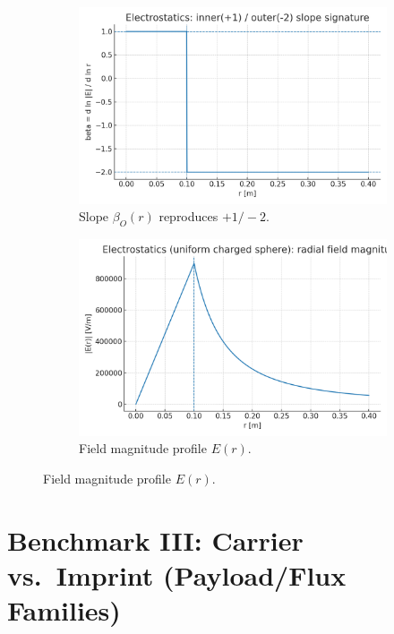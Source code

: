 \documentclass[12pt,a4paper,oneside]{scrreprt}
\begin{document}
\begin{figure}[htbp]
  \vspace{0.6em}
  \begin{subfigure}[t]{0.49\linewidth}
    \includegraphics[width=\linewidth]{electrostatics_beta_signature.png}
    \caption{Slope $\beta_O(r)$ reproduces $+1/-2$.}
    \label{fig:em:beta}
  \end{subfigure}\hfill
  \begin{subfigure}[t]{0.49\linewidth}
    \includegraphics[width=\linewidth]{electrostatics_Emag_profile.png}
    \caption{Field magnitude profile $E(r)$.}
    \label{fig:em:Emag}
  \end{subfigure}
\end{figure}


\chapter{Benchmark III: Carrier vs.\ Imprint (Payload/Flux Families)}
\end{document}
